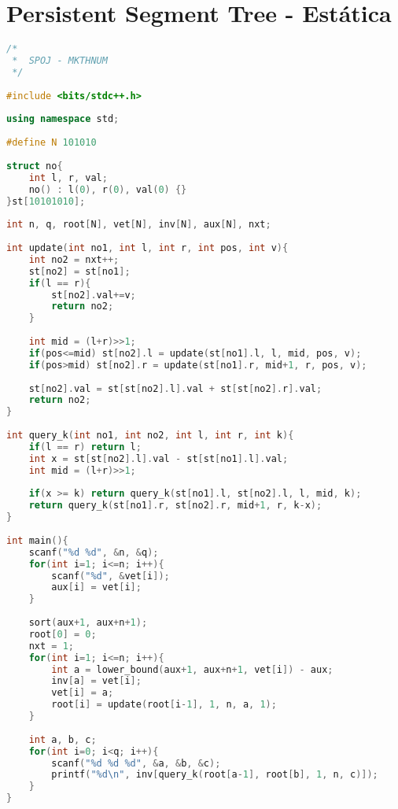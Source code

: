 \documentclass[12pt,a4paper,twoside]{report}
\begin{document}
\section{Persistent Segment Tree - Estática}
\noindent\begin{lstlisting}[caption=Persistent Segment Tree - Estática,language=C++]
/*
 *  SPOJ - MKTHNUM
 */
 
#include <bits/stdc++.h>
 
using namespace std;
 
#define N 101010
 
struct no{
    int l, r, val;
    no() : l(0), r(0), val(0) {}
}st[10101010];
 
int n, q, root[N], vet[N], inv[N], aux[N], nxt;
 
int update(int no1, int l, int r, int pos, int v){ 
    int no2 = nxt++;
    st[no2] = st[no1];
    if(l == r){
        st[no2].val+=v;
        return no2;
    }
     
    int mid = (l+r)>>1;
    if(pos<=mid) st[no2].l = update(st[no1].l, l, mid, pos, v);
    if(pos>mid) st[no2].r = update(st[no1].r, mid+1, r, pos, v);
     
    st[no2].val = st[st[no2].l].val + st[st[no2].r].val;
    return no2;
}
 
int query_k(int no1, int no2, int l, int r, int k){
    if(l == r) return l;
    int x = st[st[no2].l].val - st[st[no1].l].val;
    int mid = (l+r)>>1;     
     
    if(x >= k) return query_k(st[no1].l, st[no2].l, l, mid, k);
    return query_k(st[no1].r, st[no2].r, mid+1, r, k-x);
}
 
int main(){     
    scanf("%d %d", &n, &q);
    for(int i=1; i<=n; i++){
        scanf("%d", &vet[i]);
        aux[i] = vet[i];
    }
     
    sort(aux+1, aux+n+1);
    root[0] = 0;
    nxt = 1;
    for(int i=1; i<=n; i++){
        int a = lower_bound(aux+1, aux+n+1, vet[i]) - aux;
        inv[a] = vet[i];
        vet[i] = a;
        root[i] = update(root[i-1], 1, n, a, 1);
    }
     
    int a, b, c;
    for(int i=0; i<q; i++){
        scanf("%d %d %d", &a, &b, &c);
        printf("%d\n", inv[query_k(root[a-1], root[b], 1, n, c)]);
    }     
}
\end{lstlisting}
\end{document}
